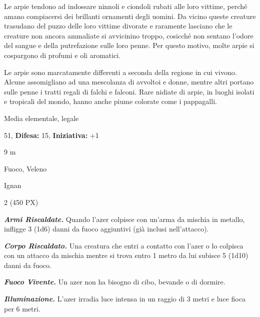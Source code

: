 \begin{multicols}{2}
{Le arpie tendono ad indossare ninnoli e ciondoli rubati alle loro vittime, perché amano compiacersi dei brillanti ornamenti degli uomini. Da vicino queste creature trasudano del puzzo delle loro vittime divorate e raramente lasciano che le creature non ancora ammaliate si avvicinino troppo, cosicché non sentano l'odore del sangue e della putrefazione sulle loro penne. Per questo motivo, molte arpie si cospargono di profumi e oli aromatici.

Le arpie sono marcatamente differenti a seconda della regione in cui vivono. Alcune assomigliano ad una mescolanza di avvoltoi e donne, mentre altri portano sulle penne i tratti regali di falchi e falconi. Rare nidiate di arpie, in luoghi isolati e tropicali del mondo, hanno anche piume colorate come i pappagalli.

\begin{description}[noitemsep, topsep=0pt, parsep=0pt, partopsep=0pt, leftmargin=0cm, labelwidth=2.2cm]
	\item[\textbf{Taglia/Tipo:}] Media elementale, legale
	\item[\textbf{Caratt.:}] 
	\item[\textbf{Punti Ferita:}] 51,  \textbf{Difesa:} 15,  \textbf{Iniziativa:} +1
	\item[\textbf{Movimento:}] 9 m
	\item[\textbf{Tiri Salvez.:}] 
	\item[\textbf{Imm. Danni:}] Fuoco, Veleno
	\item[\textbf{Linguaggi:}] Ignan
	\item[\textbf{Sfida:}] 2 (450 PX)\smallskip
\end{description}

\emph{\textbf{Armi Riscaldate.}} Quando l'azer colpisce con un'arma da mischia in metallo, infligge 3 (1d6) danni da fuoco aggiuntivi (già inclusi nell'attacco).

\emph{\textbf{Corpo Riscaldato.}} Una creatura che entri a contatto con l'azer o lo colpisca con un attacco da mischia mentre si trova entro 1 metro da lui subisce 5 (1d10) danni da fuoco.

\emph{\textbf{Fuoco Vivente.}} Un azer non ha bisogno di cibo, bevande o di dormire.

\emph{\textbf{Illuminazione.}} L'azer irradia luce intensa in un raggio di 3 metri e luce fioca per 6 metri.

}
\end{multicols}

